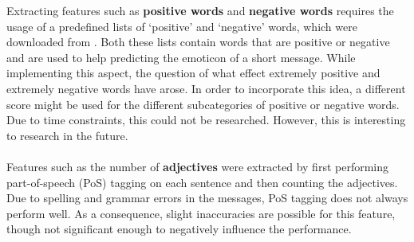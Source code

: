 \noindent Extracting features such as \textbf{positive words} and \textbf{negative words} requires the usage of a predefined lists of `positive' and `negative' words, which were downloaded from \cite{hu2004mining}. Both these lists contain words that are positive or negative and are used to help predicting the emoticon of a short message. While implementing this aspect, the question of what effect extremely positive and extremely negative words have arose. In order to incorporate this idea, a different score might be used for the different subcategories of positive or negative words. Due to time constraints, this could not be researched. However, this is interesting to research in the future.
\\
\\
Features such as the number of \textbf{adjectives} were extracted by first performing part-of-speech (PoS) tagging on each sentence and then counting the adjectives. Due to spelling and grammar errors in the messages, PoS tagging does not always perform  well. As a consequence, slight inaccuracies are possible for this feature, though not significant enough to negatively influence the performance. %

